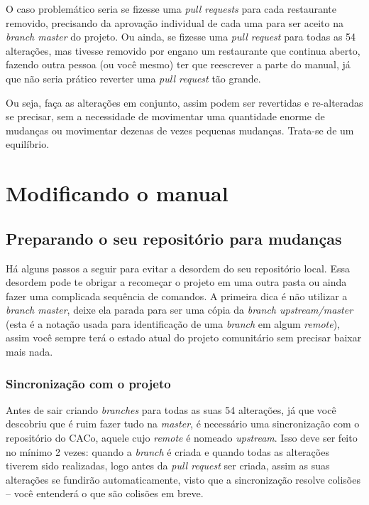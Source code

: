 \documentclass[a4paper,oneside,10pt]{memoir}
\begin{document}
O caso problemático seria se fizesse uma \emph{pull requests} para cada
restaurante removido, precisando da aprovação individual de cada uma para ser
aceito na \emph{branch master} do projeto. Ou ainda, se fizesse uma \emph{pull
request} para todas as 54 alterações, mas tivesse removido por engano um
restaurante que continua aberto, fazendo outra pessoa (ou você mesmo) ter que
reescrever a parte do manual, já que não seria prático reverter uma \emph{pull
request} tão grande.

Ou seja, faça as alterações em conjunto, assim podem ser revertidas e
re-alteradas se precisar, sem a necessidade de movimentar uma quantidade
enor\-me de mudanças ou movimentar dezenas de vezes pequenas mudanças. Trata-se
de um equilíbrio.


\chapter{Modificando o manual}

\section{Preparando o seu repositório para mudanças}

Há alguns passos a seguir para evitar a desordem do seu repositório local. Essa
desordem pode te obrigar a recomeçar o projeto em uma outra pasta ou ainda
fazer uma complicada sequência de comandos. A primeira dica é não utilizar a
\emph{branch master}, deixe ela parada para ser uma cópia da \emph{branch
upstream/master} (esta é a notação usada para identificação de uma
\emph{branch} em algum \emph{remote}), assim você sempre terá o estado atual do
projeto comunitário sem precisar baixar mais nada.

\subsection{Sincronização com o projeto}

Antes de sair criando \emph{branches} para todas as suas 54 alterações, já que
você descobriu que é ruim fazer tudo na \emph{master}, é necessário uma
sincronização com o repositório do CACo, aquele cujo \emph{remote} é nomeado
\emph{upstream}. Isso deve ser feito no mínimo 2 vezes: quando a \emph{branch}
é criada e quando todas as alterações tiverem sido realizadas, logo antes da
\emph{pull request} ser criada, assim as suas alterações se fundirão
automaticamente, visto que a sincronização resolve colisões -- você entenderá o
que são colisões em breve.
\end{document}

